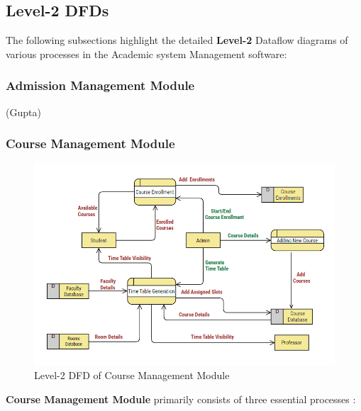 \documentclass[12pt,a4paper]{article}
\begin{document}
\subsection{Level-2 DFDs}
The following subsections highlight the detailed \textbf{Level-2} Dataflow diagrams of various processes in the Academic system Management software:
\subsubsection{Admission Management Module}
(Gupta)
\subsubsection{Course Management Module}
\begin{figure}[hbt!]
    \centering
        \includegraphics[width=\linewidth]{Course_Management_DFD.png} 
    \caption{Level-2 DFD of Course Management Module}
\end{figure}
\textbf{Course Management Module} primarily consists of three essential processes :
\end{document}
